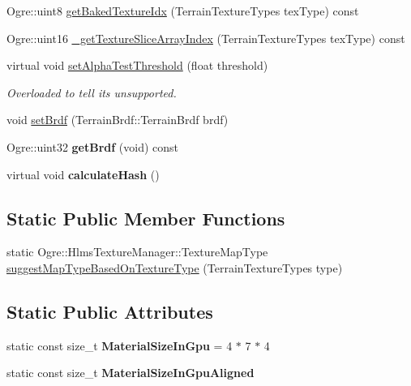\begin{DoxyCompactItemize}
\item 
Ogre\+::uint8 \hyperlink{class_hlms_terrain_datablock_a08b7b8e53cd57ca6729929602d24411a}{get\+Baked\+Texture\+Idx} (Terrain\+Texture\+Types tex\+Type) const
\item 
Ogre\+::uint16 \hyperlink{class_hlms_terrain_datablock_a19f88d8e892a4fbad4f535dcb41387d5}{\+\_\+get\+Texture\+Slice\+Array\+Index} (Terrain\+Texture\+Types tex\+Type) const
\item 
\mbox{\label{class_hlms_terrain_datablock_ab8bfdd8fe1881b494d324ed0d1fa07ce}} 
virtual void \hyperlink{class_hlms_terrain_datablock_ab8bfdd8fe1881b494d324ed0d1fa07ce}{set\+Alpha\+Test\+Threshold} (float threshold)
\begin{DoxyCompactList}\small\item\em Overloaded to tell it\textquotesingle{}s unsupported. \end{DoxyCompactList}\item 
void \hyperlink{class_hlms_terrain_datablock_ab4d3d4b79e5fa6340579ad40f8be945f}{set\+Brdf} (Terrain\+Brdf\+::\+Terrain\+Brdf brdf)
\item 
\mbox{\label{class_hlms_terrain_datablock_a8dbd965218521df0b850e6374ef7867b}} 
Ogre\+::uint32 {\bfseries get\+Brdf} (void) const
\item 
\mbox{\label{class_hlms_terrain_datablock_acf1639e0c56006527ba33fe0e1809cc6}} 
virtual void {\bfseries calculate\+Hash} ()
\end{DoxyCompactItemize}
\subsection*{Static Public Member Functions}
\begin{DoxyCompactItemize}
\item 
static Ogre\+::\+Hlms\+Texture\+Manager\+::\+Texture\+Map\+Type \hyperlink{class_hlms_terrain_datablock_a255f81387aab3171b922b9a55fea2647}{suggest\+Map\+Type\+Based\+On\+Texture\+Type} (Terrain\+Texture\+Types type)
\end{DoxyCompactItemize}
\subsection*{Static Public Attributes}
\begin{DoxyCompactItemize}
\item 
\mbox{\label{class_hlms_terrain_datablock_ab0dc7e40cc748869c93f9d965dbee085}} 
static const size\+\_\+t {\bfseries Material\+Size\+In\+Gpu} = 4 $\ast$ 7 $\ast$ 4
\item 
static const size\+\_\+t {\bfseries Material\+Size\+In\+Gpu\+Aligned}
\end{DoxyCompactItemize}
